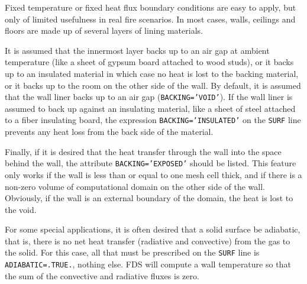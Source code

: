\documentclass[11pt]{book}
\newcommand{\ct}{\tt\small}
\begin{document}
Fixed temperature or fixed heat flux boundary conditions are
easy to apply, but only of limited usefulness in real fire scenarios.
In most cases, walls, ceilings and floors are made up of several layers
of lining materials.

It is assumed that the innermost layer backs up to an air gap at ambient
temperature (like a sheet of gypsum board attached to wood studs), or
it backs up to an insulated material in which case no heat is lost to
the backing material, or it backs up to the room on the other side of
the wall. By default, it is assumed that the wall liner backs up to an air gap
({\ct BACKING='VOID'}). If the wall liner is assumed to back up
against an insulating material, like a sheet of steel attached to a
fiber insulating board, the expression {\ct BACKING='INSULATED'} on
the {\ct SURF} line prevents any heat loss from the back side of the material.

Finally, if it is desired that the heat transfer
through the wall into the space behind the wall, the attribute
{\ct BACKING='EXPOSED'} should be listed. This feature only works
if the wall is less than or equal to one mesh cell thick, and if there is a non-zero volume
of computational domain on the other side of the wall. Obviously, if
the wall is an external boundary of the domain, the heat is lost
to the void.

For some special applications, it is often desired that a solid
surface be adiabatic, that is, there is no net heat transfer
(radiative and convective) from the gas to the solid. For this case,
all that must be prescribed on the {\ct SURF} line is {\ct
ADIABATIC=.TRUE.}, nothing else.  FDS will compute a wall temperature
so that the sum of the convective and radiative fluxes is zero.
\end{document}
